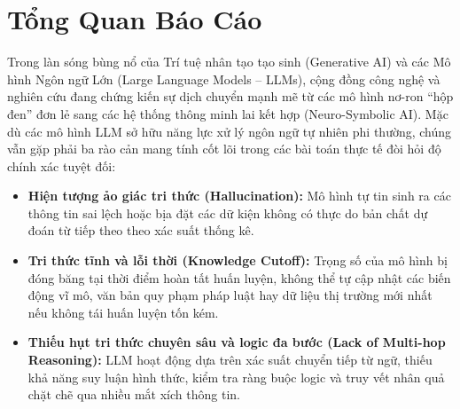 \documentclass[12pt,a4paper]{report}
\begin{document}
\tableofcontents
\newpage
\listoffigures
\newpage
\begingroup
\let\clearpage\relax
\let\cleardoublepage\relax
\listoftables
\vspace{1.5cm}
\lstlistoflistings
\endgroup
\newpage
{}

\chapter*{Tổng Quan Báo Cáo}
\vspace*{-1.2cm}
\enlargethispage{3\baselineskip}

Trong làn sóng bùng nổ của Trí tuệ nhân tạo tạo sinh (Generative AI) và các Mô hình Ngôn ngữ Lớn (Large Language Models -- LLMs), cộng đồng công nghệ và nghiên cứu đang chứng kiến sự dịch chuyển mạnh mẽ từ các mô hình nơ-ron “hộp đen” đơn lẻ sang các hệ thống thông minh lai kết hợp (Neuro-Symbolic AI). Mặc dù các mô hình LLM sở hữu năng lực xử lý ngôn ngữ tự nhiên phi thường, chúng vẫn gặp phải ba rào cản mang tính cốt lõi trong các bài toán thực tế đòi hỏi độ chính xác tuyệt đối:
\begin{itemize}[itemsep=0pt, parsep=0pt, topsep=1pt]
    \item \textbf{Hiện tượng ảo giác tri thức (Hallucination):} Mô hình tự tin sinh ra các thông tin sai lệch hoặc bịa đặt các dữ kiện không có thực do bản chất dự đoán từ tiếp theo theo xác suất thống kê.
    \item \textbf{Tri thức tĩnh và lỗi thời (Knowledge Cutoff):} Trọng số của mô hình bị đóng băng tại thời điểm hoàn tất huấn luyện, không thể tự cập nhật các biến động vĩ mô, văn bản quy phạm pháp luật hay dữ liệu thị trường mới nhất nếu không tái huấn luyện tốn kém.
    \item \textbf{Thiếu hụt tri thức chuyên sâu và logic đa bước (Lack of Multi-hop Reasoning):} LLM hoạt động dựa trên xác suất chuyển tiếp từ ngữ, thiếu khả năng suy luận hình thức, kiểm tra ràng buộc logic và truy vết nhân quả chặt chẽ qua nhiều mắt xích thông tin.
\end{itemize}
\end{document}
